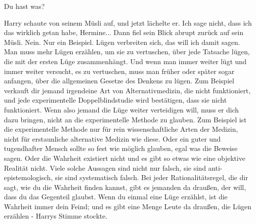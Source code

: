 \glqq Du hast was?\grqq{}

Harry schaute von seinem Müsli auf, und jetzt lächelte er. \glqq Ich sage nicht,
dass ich das wirklich getan habe, Hermine...\grqq{} Dann fiel sein Blick abrupt
zurück auf sein Müsli. \glqq Nein. Nur ein Beispiel. Lügen verbreiten sich, das
will ich damit sagen. Man muss mehr Lügen erzählen, um sie zu vertuschen, über
jede Tatsache lügen, die mit der ersten Lüge zusammenhängt. Und wenn man immer
weiter lügt und immer weiter versucht, es zu vertuschen, muss man früher oder
später sogar anfangen, über die allgemeinen Gesetze des Denkens zu lügen. Zum
Beispiel verkauft dir jemand irgendeine Art von Alternativmedizin, die nicht
funktioniert, und jede experimentelle Doppelblindstudie wird bestätigen, dass
sie nicht funktioniert. Wenn also jemand die Lüge weiter verteidigen will, muss
er dich dazu bringen, nicht an die experimentelle Methode zu glauben. Zum
Beispiel ist die experimentelle Methode nur für rein wissenschaftliche Arten der
Medizin, nicht für erstaunliche alternative Medizin wie diese. Oder ein guter
und tugendhafter Mensch sollte so fest wie möglich glauben, egal was die Beweise
sagen. Oder die Wahrheit existiert nicht und es gibt so etwas wie eine objektive
Realität nicht. Viele solche Aussagen sind nicht nur falsch, sie sind
anti-epistemologisch, sie sind systematisch falsch. Bei jeder
Rationalitätsregel, die dir sagt, wie du die Wahrheit finden kannst, gibt es
jemanden da draußen, der will, dass du das Gegenteil glaubst. Wenn du einmal
eine Lüge erzählst, ist die Wahrheit immer dein Feind; und es gibt eine Menge
Leute da draußen, die Lügen erzählen -\grqq{} Harrys Stimme stockte.

